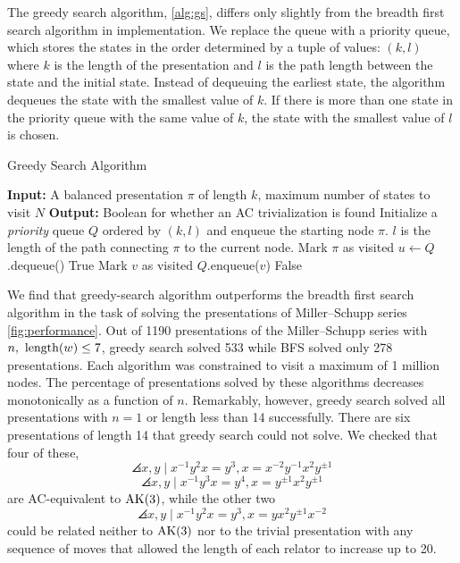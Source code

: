 The greedy search algorithm, \autoref{alg:gs}, differs only slightly from the breadth first search algorithm in implementation. We replace the queue with a priority queue, which stores the states in the order determined by a tuple of values: $(k, l)$ where $k$ is the length of the presentation and $l$ is the path length between the state and the initial state. Instead of dequeuing the earliest state, the algorithm dequeues the state with the smallest value of $k$. If there is more than one state in the priority queue with the same value of $k$, the state with the smallest value of $l$ is chosen.
\newline

\begin{algorithm}
\caption{Greedy Search Algorithm}\label{alg:gs}
\begin{algorithmic}[1] %
\State \textbf{Input:} A balanced presentation $\pi$ of length $k$, maximum number of states to visit $N$
\State \textbf{Output:} Boolean for whether an AC trivialization is found
\State Initialize a \textit{priority} queue $Q$ ordered by $(k, l)$ and enqueue the starting node $\pi$. $l$ is the length of the path connecting $\pi$ to the current node.
\State Mark $\pi$ as visited
    \State $u \gets Q$.dequeue() 
            \State \Return True 
        \EndIf
            \State Mark $v$ as visited
            \State $Q$.enqueue($v$) 
        \EndIf
    \EndFor
\EndWhile
\State \Return False 
\end{algorithmic}
\end{algorithm}

We find that greedy-search algorithm outperforms the breadth first search algorithm in the task of solving the presentations of Miller--Schupp series \autoref{fig:performance}. Out of 1190 presentations of the Miller--Schupp series with $n, \ \operatorname{length}(w) \leq 7$, greedy search solved 533 while BFS solved only 278 presentations. Each algorithm was constrained to visit a maximum of 1 million nodes. The percentage of presentations solved by these algorithms decreases monotonically as a function of $n$. Remarkably, however, greedy search solved all presentations with $n=1$ or length less than 14 successfully. There are six presentations of length 14 that greedy search could not solve. We checked that four of these,
\[
\angles{x, y \mid x^{-1} y^2 x = y^{3} , x = x^{-2} y^{-1} x^2 y^{\pm 1}}
\]
\[
\angles{x, y \mid x^{-1} y^3 x = y^{4} , x = y^{\pm 1} x^2 y^{\pm 1}}
\]
are AC-equivalent to $\text{AK}(3)$, while the other two
\[
\angles{x, y \mid x^{-1} y^2 x = y^{3} , x = y x^2 y^{\pm 1} x^{-2}}
\]
could be related neither to $\text{AK}(3)$ nor to the trivial presentation with any sequence of moves that allowed the length of each relator to increase up to 20.
\newline

